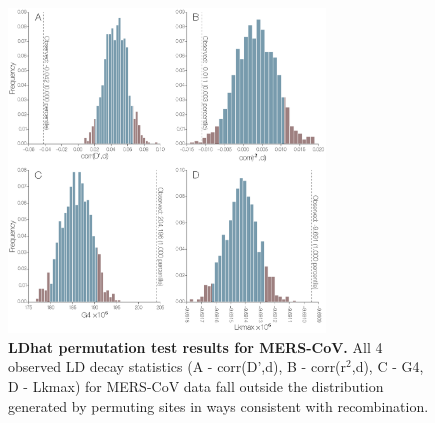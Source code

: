 \documentclass[11pt,oneside,letterpaper]{article}
\begin{document}

\begin{figure}[h]
	\centering	
	\includegraphics[width=0.75\textwidth]{figures/supp_MERS_permutations.png}
	\caption{\textbf{LDhat permutation test results for MERS-CoV.}
All 4 observed LD decay statistics (A - corr(D',d), B - corr(r$^{2}$,d), C - G4, D - Lkmax) for MERS-CoV data fall outside the distribution generated by permuting sites in ways consistent with recombination.}
	\label{MERS_permutations}
\end{figure}

\end{document}
